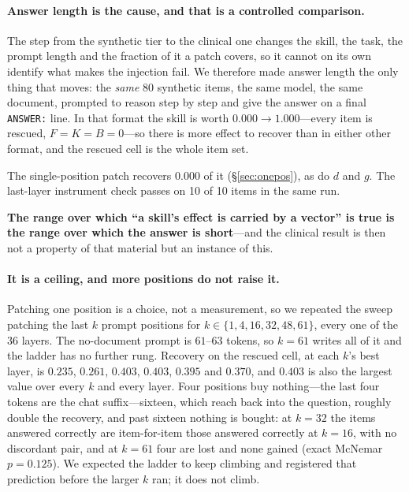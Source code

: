 \documentclass{article}
\newcommand{\dvec}{\ensuremath{d}}
\newcommand{\gvec}{\ensuremath{g}}
\begin{document}
\paragraph{Answer length is the cause, and that is a controlled comparison.}
The step from the synthetic tier to the clinical one changes the skill, the
task, the prompt length and the fraction of it a patch covers, so it cannot on
its own identify what makes the injection fail. We therefore made answer length
the only thing that moves: the \emph{same} 80 synthetic items, the same model,
the same document, prompted to reason step by step and give the answer on a
final \texttt{ANSWER:} line. In that format the skill is worth $0.000 \to
1.000$---every item is rescued, $F=K=B=0$---so there is more effect to recover
than in either other format, and the rescued cell is the whole item set.

The single-position patch recovers $\mathbf{0.000}$ of it
(\S\ref{sec:onepos}), as do $\dvec$ and $\gvec$. The last-layer
instrument check passes on 10 of 10 items in the same run.





\textbf{The range over which ``a skill's effect is carried by a vector'' is true
is the range over which the answer is short}---and the clinical result is then
not a property of that material but an instance of this.

\paragraph{It is a ceiling, and more positions do not raise it.} Patching one
position is a choice, not a measurement, so we repeated the sweep patching the
last $k$ prompt positions for $k \in \{1,4,16,32,48,61\}$, every one of the
$36$ layers. The no-document prompt is $61$--$63$ tokens, so $k=61$ writes all
of it and the ladder has no further rung. Recovery on the rescued cell, at each
$k$'s best layer, is $0.235$, $0.261$, $0.403$, $0.403$, $0.395$ and $0.370$,
and $0.403$ is also the largest value over every $k$ and every layer. Four
positions buy nothing---the last four tokens are the chat suffix---sixteen,
which reach back into the question, roughly double the recovery, and past
sixteen nothing is bought: at $k=32$ the items answered correctly are
item-for-item those answered correctly at $k=16$, with no discordant pair, and
at $k=61$ four are lost and none gained (exact McNemar $p=0.125$). We expected
the ladder to keep climbing and registered that prediction before the larger
$k$ ran; it does not climb.
\end{document}
